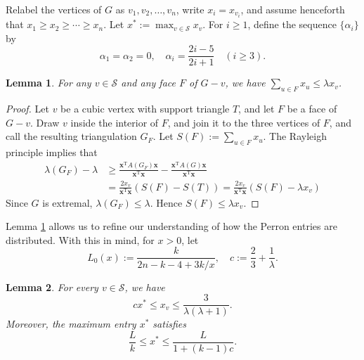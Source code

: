 \documentclass[11pt]{article}
\theoremstyle{plain}
\newtheorem{lemma}{Lemma}[section]
\theoremstyle{definition}
\numberwithin{equation}{section}
\begin{document}
Relabel the vertices of $G$ as $v_1,v_2,\ldots,v_n$, write $x_i = x_{v_i}$, and
assume henceforth that $x_1\geq x_2\geq\cdots\geq x_n$.
Let $x^*:= \max_{v\in\mathcal{S}} x_v$. For $i\geq 1$, define the sequence $\{\alpha_i\}$ by 
\[
\alpha_1 = \alpha_2 = 0, \quad 
\alpha_i = \frac{2i - 5}{2i + 1} \quad (i\geq 3).
\]

\begin{lemma}\label{lem:cubic-x-lower-bound}
For any $v\in\mathcal{S}$ and any face $F$ of $G-v$, we have 
$\sum_{u\in F} x_u \leq\lambda x_v$.
\end{lemma}

\begin{proof}
Let $v$ be a cubic vertex with support triangle $T$, and let $F$ be a face
of $G-v$. Draw $v$ inside the interior of $F$, and join it to the three vertices of
$F$, and call the resulting triangulation $G_F$. Let
$S(F) := \sum_{u\in F} x_u$. The Rayleigh principle implies that
\begin{align*}
\lambda (G_F) - \lambda
& \geq \frac{\bm{x}^{\mathrm{T}} A(G_F) \bm{x}}{\bm{x}^{\mathrm{T}} \bm{x}} - \frac{\bm{x}^{\mathrm{T}} A(G) \bm{x}}{\bm{x}^{\mathrm{T}} \bm{x}} \\
& = \frac{2x_v}{\bm{x}^{\mathrm{T}} \bm{x}} (S(F) - S(T))
= \frac{2x_v}{\bm{x}^{\mathrm{T}} \bm{x}} (S(F) - \lambda x_v)
\end{align*}
Since $G$ is extremal, $\lambda(G_F)\leq\lambda$. Hence
$S(F)\leq \lambda x_v$.
\end{proof}

Lemma \ref{lem:cubic-x-lower-bound} allows us to refine our understanding of how the Perron 
entries are distributed. With this in mind, for $x>0$, let 
\[
L_0(x):= \frac{k}{2n - k - 4 + 3k/x}, \quad 
c:= \frac{2}{3} + \frac{1}{\lambda}.
\]

\begin{lemma}\label{lem:relocation}
For every $v\in\mathcal{S}$, we have
\begin{equation}\label{eq:x-upper-bound}
cx^* \leq x_v \leq\frac{3}{\lambda(\lambda + 1)}.
\end{equation}
Moreover, the maximum entry $x^*$ satisfies
\begin{equation}\label{eq:M-upper-bound}
\frac{L}{k} \leq x^* \leq\frac{L}{1+(k-1)c}.
\end{equation}
\end{lemma}
\end{document}

